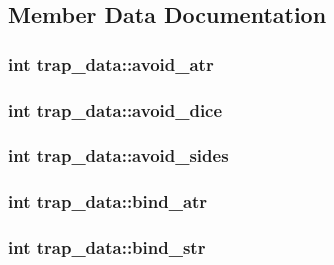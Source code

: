 \subsection{Member Data Documentation}
\hypertarget{structtrap__data_a2d636d7075a7861fe40343fd535897e4}{
\subsubsection[{avoid\-\_\-atr}]{\setlength{\rightskip}{0pt plus 5cm}int trap\-\_\-data\-::avoid\-\_\-atr}}\label{structtrap__data_a2d636d7075a7861fe40343fd535897e4}
\hypertarget{structtrap__data_ac8fea4e9321d61fd328b54ce2a8e3325}{
\subsubsection[{avoid\-\_\-dice}]{\setlength{\rightskip}{0pt plus 5cm}int trap\-\_\-data\-::avoid\-\_\-dice}}\label{structtrap__data_ac8fea4e9321d61fd328b54ce2a8e3325}
\hypertarget{structtrap__data_a3e2814bd059a0eac8492c47820b44581}{
\subsubsection[{avoid\-\_\-sides}]{\setlength{\rightskip}{0pt plus 5cm}int trap\-\_\-data\-::avoid\-\_\-sides}}\label{structtrap__data_a3e2814bd059a0eac8492c47820b44581}
\hypertarget{structtrap__data_a3d33e8970f01722b1b94ceb18ee5fc25}{
\subsubsection[{bind\-\_\-atr}]{\setlength{\rightskip}{0pt plus 5cm}int trap\-\_\-data\-::bind\-\_\-atr}}\label{structtrap__data_a3d33e8970f01722b1b94ceb18ee5fc25}
\hypertarget{structtrap__data_a438a89fdae52b8d0df37679929e1a42a}{
\subsubsection[{bind\-\_\-str}]{\setlength{\rightskip}{0pt plus 5cm}int trap\-\_\-data\-::bind\-\_\-str}}\label{structtrap__data_a438a89fdae52b8d0df37679929e1a42a}
